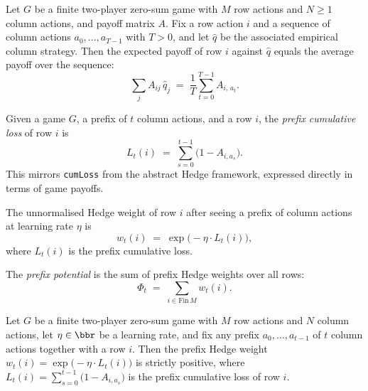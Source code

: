 \begin{lemma}
\label{pureVsPayoff_empiricalStrategy}
\leanok
{}
Let $G$ be a finite two-player zero-sum game with $M$ row actions and $N \ge 1$ column
actions, and payoff matrix $A$. Fix a row action $i$ and a sequence of column actions
$a_0, \dots, a_{T-1}$ with $T > 0$, and let $\hat{q}$ be the associated empirical column
strategy. Then the expected payoff of row $i$ against $\hat{q}$ equals the average
payoff over the sequence:
\[
  \sum_{j} A_{ij}\,\hat{q}_j \;=\; \frac{1}{T}\sum_{t=0}^{T-1} A_{i,\,a_t}.
\]
\end{lemma}

\begin{definition}
\label{prefixGameLoss}
\leanok
{}
Given a game $G$, a prefix of $t$ column actions, and a row $i$, the
\emph{prefix cumulative loss} of row $i$ is
\[
  L_t(i) \;=\; \sum_{s=0}^{t-1} \bigl(1 - A_{i, a_s}\bigr).
\]
This mirrors \texttt{cumLoss} from the abstract Hedge framework, expressed
directly in terms of game payoffs.
\end{definition}

\begin{definition}
\label{prefixHedgeWeight}
\leanok
{}
The unnormalised Hedge weight of row $i$ after seeing a prefix of column
actions at learning rate $\eta$ is
\[
  w_t(i) \;=\; \exp\!\bigl(-\eta \cdot L_t(i)\bigr),
\]
where $L_t(i)$ is the prefix cumulative loss.
\end{definition}

\begin{definition}
\label{prefixPotential}
\leanok
{}
The \emph{prefix potential} is the sum of prefix Hedge weights over all rows:
\[
  \Phi_t \;=\; \sum_{i \in \mathrm{Fin}\,M} w_t(i).
\]
\end{definition}

\begin{lemma}
\label{prefixHedgeWeight_pos}
\leanok
{}
Let $G$ be a finite two-player zero-sum game with $M$ row actions and $N$ column
actions, let $\eta \in \bbr$ be a learning rate, and fix any prefix $a_0, \dots,
a_{t-1}$ of $t$ column actions together with a row $i$. Then the prefix Hedge weight
$w_t(i) = \exp\!\bigl(-\eta \cdot L_t(i)\bigr)$ is strictly positive, where $L_t(i) =
\sum_{s=0}^{t-1}\bigl(1 - A_{i,a_s}\bigr)$ is the prefix cumulative loss of row $i$.
\end{lemma}

